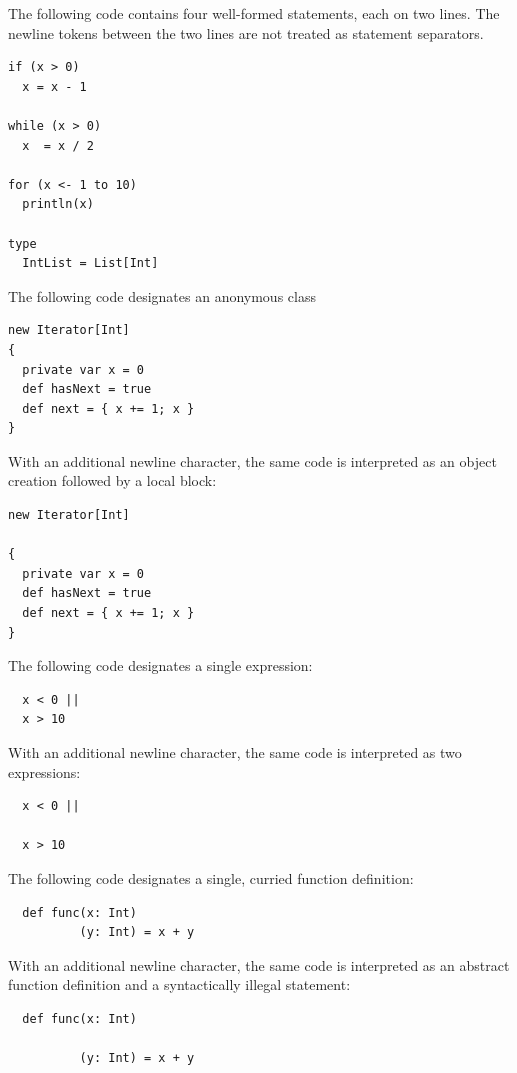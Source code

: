 \example The following code contains four well-formed statements, each
on two lines. The newline tokens between the two lines are not
treated as statement separators.
\begin{lstlisting}
if (x > 0)
  x = x - 1

while (x > 0)
  x  = x / 2

for (x <- 1 to 10)
  println(x)

type
  IntList = List[Int]
\end{lstlisting}

\example The following code designates an anonymous class
\begin{lstlisting}
new Iterator[Int]
{
  private var x = 0
  def hasNext = true
  def next = { x += 1; x }
}
\end{lstlisting}

With an additional newline character, the same code is interpreted as
an object creation followed by a local block:

\begin{lstlisting}
new Iterator[Int] 

{
  private var x = 0
  def hasNext = true
  def next = { x += 1; x }
}
\end{lstlisting}

\example The following code designates a single expression:

\begin{lstlisting}
  x < 0 ||
  x > 10
\end{lstlisting}

With an additional newline character, the same code is interpreted as
two expressions:

\begin{lstlisting}
  x < 0 ||

  x > 10
\end{lstlisting}

\example The following code designates a single, curried function definition:

\begin{lstlisting}
  def func(x: Int)
          (y: Int) = x + y
\end{lstlisting}

With an additional newline character, the same code is interpreted as
an abstract function definition and a syntactically illegal statement:

\begin{lstlisting}
  def func(x: Int)

          (y: Int) = x + y
\end{lstlisting}

